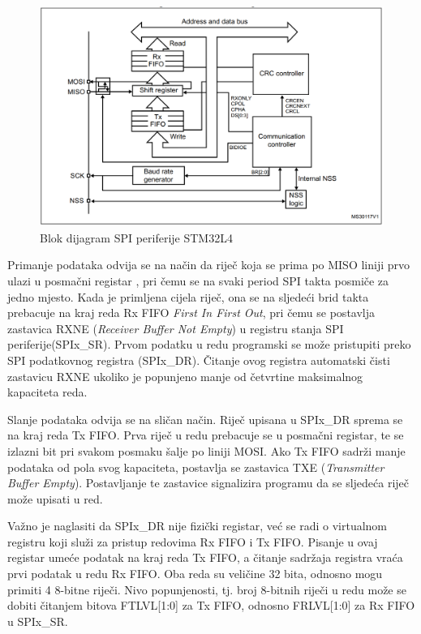\begin{figure}[htb]
	\centering
	\includegraphics{slike/STM32L4_SPI_blok_dijagram.png}
	\caption{Blok dijagram SPI periferije STM32L4 \cite[str.~1451]{stm32l4_manual}}
	\label{fig:stm32l4_spi}
\end{figure}

Primanje podataka odvija se na način da riječ koja se prima po MISO liniji prvo ulazi u posmačni registar , pri čemu se na svaki period SPI takta posmiče za jedno mjesto. Kada je primljena cijela riječ, ona se na sljedeći brid takta prebacuje na kraj reda Rx FIFO \textit{First In First Out}, pri čemu se postavlja zastavica RXNE (\textit{Receiver Buffer Not Empty}) u registru stanja SPI periferije(SPIx\_SR). Prvom podatku u redu programski se može pristupiti preko SPI podatkovnog registra (SPIx\_DR). Čitanje ovog registra automatski čisti zastavicu RXNE ukoliko je popunjeno manje od četvrtine maksimalnog kapaciteta reda.

Slanje podataka odvija se na sličan način. Riječ upisana u SPIx\_DR sprema se na kraj reda Tx FIFO. Prva riječ u redu prebacuje se u posmačni registar, te se izlazni bit pri svakom posmaku šalje po liniji MOSI. Ako Tx FIFO sadrži manje podataka od pola svog kapaciteta, postavlja se zastavica TXE (\textit{Transmitter Buffer Empty}). Postavljanje te zastavice signalizira programu da se sljedeća riječ može upisati u red.

Važno je naglasiti da SPIx\_DR nije fizički registar, već se radi o virtualnom registru koji služi za pristup redovima Rx FIFO i Tx FIFO. Pisanje u ovaj registar umeće podatak na kraj reda Tx FIFO, a čitanje sadržaja registra vraća prvi podatak u redu Rx FIFO. Oba reda su veličine 32 bita, odnosno mogu primiti 4 8-bitne riječi. Nivo popunjenosti, tj. broj 8-bitnih riječi u redu može se dobiti čitanjem bitova FTLVL[1:0] za Tx FIFO, odnosno FRLVL[1:0] za Rx FIFO u SPIx\_SR. 

